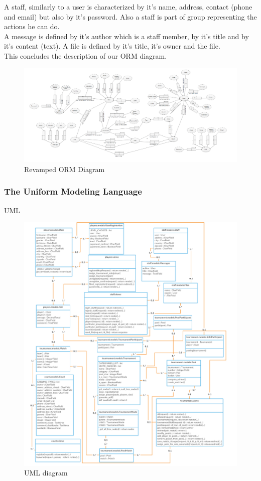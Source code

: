 \documentclass[a4paper, 12pt]{article}
\begin{document}
A staff, similarly to a user is characterized by it's name, address, contact (phone and email) but also by it's password. Also a staff is part of group representing the actions he can do. \\

A message is defined by it's author which is a staff member, by it's title and by it's content (text). A file is defined by it's title, it's owner and the file.\\

This concludes the description of our ORM diagram. 

\begin{figure}[ht!]
\caption{\label{orm2} Revamped ORM Diagram}
\includegraphics[scale=0.60, angle=90]{ormp2.PNG}
\end{figure}
\FloatBarrier


\subsubsection{The Uniform Modeling Language}
UML
\begin{figure}[h]
	\centering
 	\caption{\label{uml} UML diagram}
	\includegraphics[scale=0.2]{Class.png}
\end{figure}
\FloatBarrier
\end{document}

